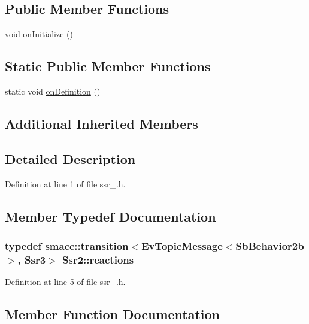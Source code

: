 \subsection*{Public Member Functions}
\begin{DoxyCompactItemize}
\item 
void \hyperlink{structSsr2_a2cf5995600fcc702887dde10aee84902}{on\+Initialize} ()
\end{DoxyCompactItemize}
\subsection*{Static Public Member Functions}
\begin{DoxyCompactItemize}
\item 
static void \hyperlink{structSsr2_ab5924184e178dac57b8f6737bb61cbc6}{on\+Definition} ()
\end{DoxyCompactItemize}
\subsection*{Additional Inherited Members}


\subsection{Detailed Description}


Definition at line 1 of file ssr\+\_.\+h.



\subsection{Member Typedef Documentation}
\subsubsection[{\texorpdfstring{reactions}{reactions}}]{\setlength{\rightskip}{0pt plus 5cm}typedef {\bf smacc\+::transition}$<$Ev\+Topic\+Message$<$Sb\+Behavior2b$>$, {\bf Ssr3}$>$ {\bf Ssr2\+::reactions}}\hypertarget{structSsr2_a70cc14170685fc98f9256e45cdc058c0}{}\label{structSsr2_a70cc14170685fc98f9256e45cdc058c0}


Definition at line 5 of file ssr\+\_.\+h.



\subsection{Member Function Documentation}
